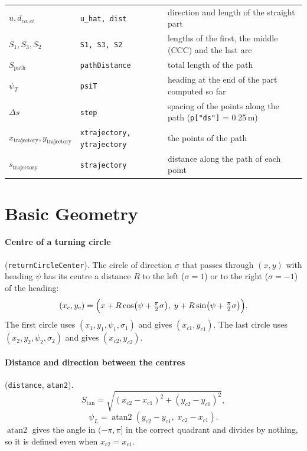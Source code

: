 \documentclass[10pt]{article}
\newcommand{\code}[1]{\texttt{#1}}
\newcommand{\Stan}{S_{\tan}}
\newcommand{\Spath}{S_{\mathrm{path}}}
\newcommand{\xtraj}{x_{\mathrm{trajectory}}}
\newcommand{\ytraj}{y_{\mathrm{trajectory}}}
\newcommand{\straj}{s_{\mathrm{trajectory}}}
\newcommand{\dcoci}{d_{co,ci}}
\begin{document}
\begin{table}[t]
\begin{tabularx}{\textwidth}{@{}l l >{\raggedright\arraybackslash}X@{}}
$\hat{u}, \dcoci$ & \code{u\_hat, dist} & direction and length of the straight part \\
$S_1, S_3, S_2$ & \code{S1, S3, S2} & lengths of the first, the middle (CCC) and the last arc \\
$\Spath$ & \code{pathDistance} & total length of the path \\
$\psi_T$ & \code{psiT} & heading at the end of the part computed so far \\
$\Delta s$ & \code{step} & spacing of the points along the path (\code{p["ds"]} = 0.25\,m) \\
$\xtraj, \ytraj$ & \code{xtrajectory, ytrajectory} & the points of the path \\
$\straj$ & \code{strajectory} & distance along the path of each point \\
\bottomrule
\end{tabularx}
\end{table}

\section{Basic Geometry}

\paragraph{Centre of a turning circle} (\code{returnCircleCenter}). The circle of direction $\sigma$ that passes
through $(x, y)$ with heading $\psi$ has its centre a distance $R$ to the left ($\sigma = 1$) or to the right
($\sigma = -1$) of the heading:
\begin{equation}
  (x_c, y_c) = \Bigl( x + R \cos\bigl(\psi + \tfrac{\pi}{2}\sigma\bigr),\;
                      y + R \sin\bigl(\psi + \tfrac{\pi}{2}\sigma\bigr) \Bigr).
  \label{eq:centre}
\end{equation}
The first circle uses $(x_1, y_1, \psi_1, \sigma_1)$ and gives $(x_{c1}, y_{c1})$. The last circle uses
$(x_2, y_2, \psi_2, \sigma_2)$ and gives $(x_{c2}, y_{c2})$.

\paragraph{Distance and direction between the centres} (\code{distance}, \code{atan2}).
\begin{equation}
  \Stan = \sqrt{(x_{c2} - x_{c1})^2 + (y_{c2} - y_{c1})^2},
  \label{eq:stan}
\end{equation}
\begin{equation}
  \psi_L = \operatorname{atan2}(y_{c2} - y_{c1},\; x_{c2} - x_{c1}).
  \label{eq:psiL}
\end{equation}
$\operatorname{atan2}$ gives the angle in $(-\pi, \pi]$ in the correct quadrant and divides by nothing, so it is
defined even when $x_{c2} = x_{c1}$.
\end{document}
